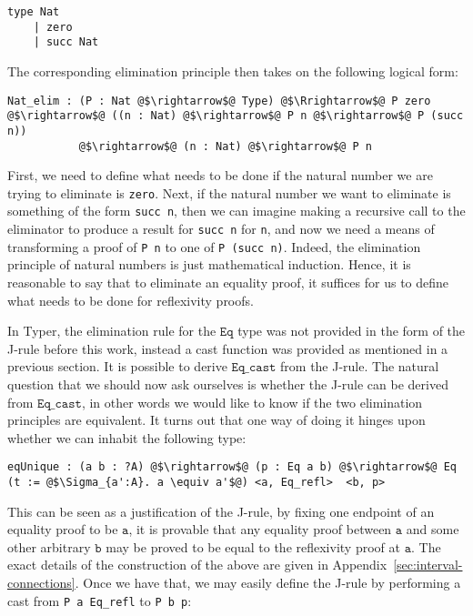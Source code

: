 \documentclass[12pt,twoside,maitrise]{dms}
\theoremstyle{definition}
\numberwithin{equation}{section}
\numberwithin{table}{chapter}
\numberwithin{figure}{chapter}
\newcommand\id[1] {\texttt{#1}}
\newcommand\fn[1] {\texttt{#1}}
\begin{document}
\begin{verbatim}
type Nat
    | zero
    | succ Nat
\end{verbatim}

The corresponding elimination principle then takes on the following logical form:

\begin{verbatim}
Nat_elim : (P : Nat @$\rightarrow$@ Type) @$\Rrightarrow$@ P zero @$\rightarrow$@ ((n : Nat) @$\rightarrow$@ P n @$\rightarrow$@ P (succ n))
           @$\rightarrow$@ (n : Nat) @$\rightarrow$@ P n
\end{verbatim}

First, we need to define what needs to be done if the natural number we are
trying to eliminate is \id{zero}. Next, if the natural number we want to
eliminate is something of the form \fn{succ n}, then we can imagine making a
recursive call to the eliminator to produce a result for \fn{succ n} for \id{n},
and now we need a means of transforming a proof of \fn{P n} to one of \fn{P
  (succ n)}. Indeed, the elimination principle of natural numbers is just
mathematical induction. Hence, it is reasonable to say that to eliminate an
equality proof, it suffices for us to define what needs to be done for
reflexivity proofs.

In Typer, the elimination rule for the $\id{Eq}$ type was not provided in the
form of the J-rule before this work, instead a cast function was provided as
mentioned in a previous section. It is possible to derive $\id{Eq\_cast}$ from
the J-rule. The natural question that we should now ask ourselves is whether the
J-rule can be derived from $\id{Eq\_cast}$, in other words we would like to know
if the two elimination principles are equivalent. It turns out that one way of
doing it hinges upon whether we can inhabit the following type:

\begin{verbatim}
eqUnique : (a b : ?A) @$\rightarrow$@ (p : Eq a b) @$\rightarrow$@ Eq (t := @$\Sigma_{a':A}. a \equiv a'$@) <a, Eq_refl>  <b, p>
\end{verbatim}

This can be seen as a justification of the J-rule, by fixing one endpoint of an
equality proof to be $\fn{a}$, it is provable that any equality proof between
$\fn{a}$ and some other arbitrary $\fn{b}$ may be proved to be equal to the
reflexivity proof at $\fn{a}$. The exact details of the construction of the
above are given in Appendix~\ref{sec:interval-connections}. Once we have that,
we may easily define the J-rule by performing a cast from \fn{P a Eq\_refl} to
\fn{P b p}:
\end{document}
